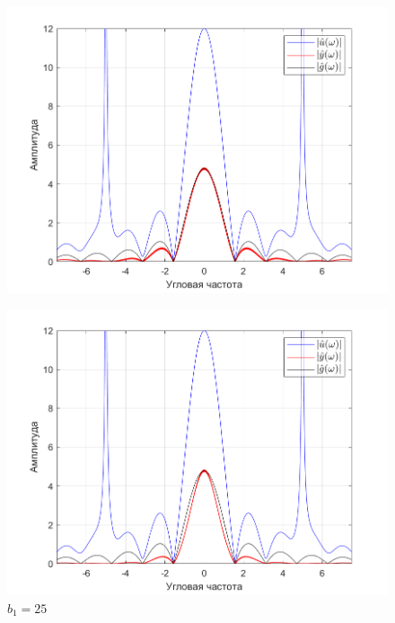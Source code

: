 \documentclass[a4paper]{article}
\begin{document}
\begin{figure}[H]
    \begin{minipage}{0.5\textwidth}
        \centering
        \includegraphics[width=\linewidth]{ex1_2/приближение/a1=0_a2=25_b1=10.5_b2=25_d=5/h4.png}
        \label{fig:d_5_b1_10.5}
        \caption{$b_1=10.5$}
    \end{minipage}
    \begin{minipage}{0.5\textwidth}
        \centering
        \includegraphics[width=\linewidth]{ex1_2/приближение/a1=0_a2=25_b1=25_b2=25_d=5/h4.png}
        \caption{$b_1=25$}
    \end{minipage}
\end{figure}
\end{document}
